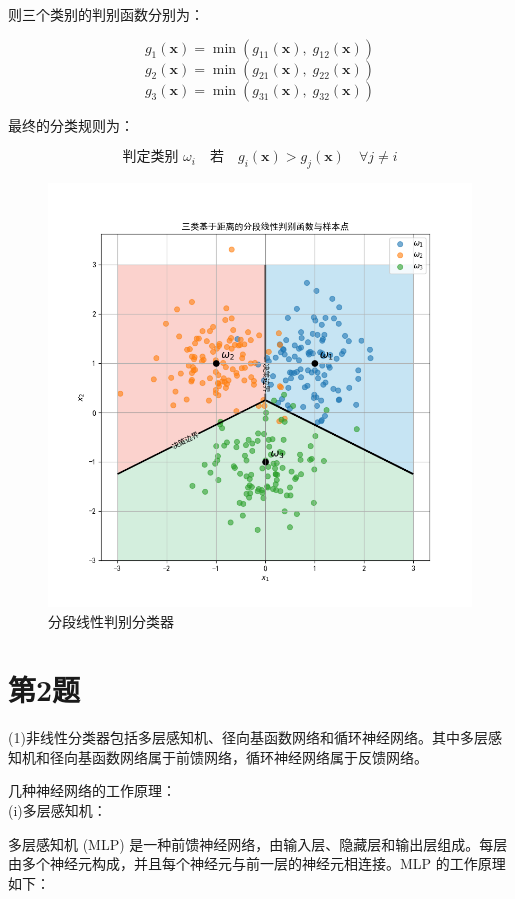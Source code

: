 \documentclass{article}
\begin{document}
则三个类别的判别函数分别为：

\[
g_1(\mathbf{x}) = \min\left( g_{11}(\mathbf{x}),\; g_{12}(\mathbf{x}) \right)
\]
\[
g_2(\mathbf{x}) = \min\left( g_{21}(\mathbf{x}),\; g_{22}(\mathbf{x}) \right)
\]
\[
g_3(\mathbf{x}) = \min\left( g_{31}(\mathbf{x}),\; g_{32}(\mathbf{x}) \right)
\]

最终的分类规则为：

\[
\text{判定类别 } \omega_i \quad \text{若} \quad g_i(\mathbf{x}) > g_j(\mathbf{x}) \quad \forall j \ne i
\]
\begin{figure}[htbp]
    \centering
    \includegraphics[scale=0.4]{T1分段分类.png}
    \caption{分段线性判别分类器}
    \label{fig:image1}
\end{figure}

\section*{第2题}
(1)非线性分类器包括多层感知机、径向基函数网络和循环神经网络。其中多层感知机和径向基函数网络属于前馈网络，循环神经网络属于反馈网络。

几种神经网络的工作原理：\\
(i)多层感知机：

多层感知机 (MLP) 是一种前馈神经网络，由输入层、隐藏层和输出层组成。每层由多个神经元构成，并且每个神经元与前一层的神经元相连接。MLP 的工作原理如下：
\end{document}
